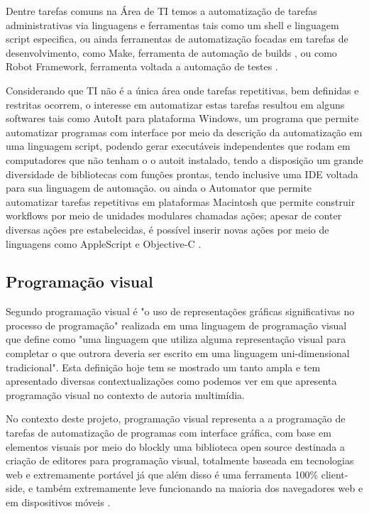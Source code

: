 \documentclass[12pt]{article}
\begin{document}
	Dentre tarefas comuns na Área de TI temos a automatização de tarefas administrativas via linguagens e ferramentas tais como um shell e linguagem script especifica, ou ainda ferramentas de automatização focadas em tarefas de desenvolvimento, como Make, ferramenta de automação de builds , ou como Robot Framework, ferramenta voltada a automação de testes \cite{shell,make,robotFW}.

	Considerando que TI não é a única área onde tarefas repetitivas, bem definidas e restritas ocorrem, o interesse em automatizar estas tarefas resultou em alguns softwares tais como AutoIt para plataforma Windows, um programa que permite automatizar programas com interface por meio da descrição da automatização em uma linguagem script, podendo gerar executáveis independentes que rodam em computadores que não tenham o o autoit instalado, tendo a disposição um grande diversidade de bibliotecas com funções prontas, tendo inclusive uma IDE voltada para sua linguagem de automação. ou ainda o Automator que permite automatizar tarefas repetitivas em plataformas Macintosh que permite construir workflows por meio de unidades modulares chamadas ações; apesar de conter diversas ações pre estabelecidas, é possível inserir novas ações por meio de linguagens como AppleScript e Objective-C \cite{autoit,automator}.
	

	\subsection{Programação visual}
	
	Segundo \citeauthor{visualProgram}\cite{visualProgram} programação visual é "o uso de representações gráficas significativas no processo de programação" realizada em uma linguagem de programação visual que \citeauthor{visualProgram} define como "uma linguagem que utiliza alguma representação visual para completar o que outrora deveria ser escrito em uma linguagem uni-dimensional tradicional". Esta definição hoje tem se mostrado um tanto ampla e tem apresentado diversas contextualizações como podemos ver em \cite{visualProgAuth} que apresenta programação visual no contexto de autoria multimídia.
	
	No contexto deste projeto, programação visual representa a a programação de tarefas de automatização de programas com interface gráfica, com base em elementos visuais por meio do blockly uma biblioteca open source destinada a criação de editores para programação visual, totalmente baseada em tecnologias web e extremamente portável já que além disso é uma ferramenta 100\% client-side, e também extremamente leve funcionando na maioria dos navegadores web e em dispositivos móveis \cite{Blockly}.
	
\end{document}
